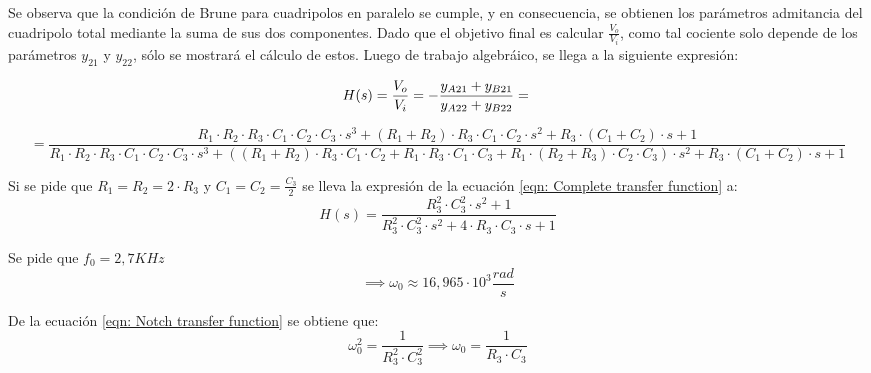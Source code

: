 Se observa que la condici\'on de Brune para cuadripolos en paralelo se cumple, y en consecuencia, se obtienen los par\'ametros admitancia del cuadripolo total mediante la suma de sus dos componentes.
Dado que el objetivo final es calcular $\frac{V_o}{V_i}$, como tal cociente solo depende de los par\'ametros $y_{21}$ y $y_{22}$, s\'olo se mostrar\'a el c\'alculo de estos.
Luego de trabajo algebr\'aico, se llega a la siguiente expresi\'on:

\begin{equation}
    H(s) = \frac{V_o}{V_i} = -\frac{y_{A21} + y_{B21}}{y_{A22} + y_{B22}} = \\
\end{equation}

\begin{equation} 
    \label{eqn: Complete transfer function}
    = \frac{R_1 \cdot R_2 \cdot R_3 \cdot C_1 \cdot C_2 \cdot C_3 \cdot s^3 + \left(R_1 + R_2\right) \cdot R_3 \cdot C_1 \cdot C_2 \cdot s^2 + R_3 \cdot \left(C_1 +C_2\right) \cdot s + 1}
    {R_1 \cdot R_2 \cdot R_3 \cdot C_1 \cdot C_2 \cdot C_3 \cdot s^3 + \left(\left(R_1 + R_2\right) \cdot R_3 \cdot C_1 \cdot C_2 + R_1 \cdot R_3 \cdot C_1 \cdot C_3 + R_1 \cdot \left(R_2 + R_3\right) \cdot C_2 \cdot C_3\right) \cdot s^2 + R_3 \cdot \left(C_1 +C_2\right) \cdot s + 1}
\end{equation}

Si se pide que $R_1 = R_2 = 2 \cdot R_3$ y $C_1 = C_2 = \frac{C_3}{2}$ se lleva la expresi\'on de la ecuaci\'on \ref{eqn: Complete transfer function} a:
\begin{equation} 
    \label{eqn: Notch transfer function}
    H(s) = \frac{R_3^2 \cdot C_3^2 \cdot s^2 + 1}{R_3^2 \cdot C_3^2 \cdot s^2 + 4 \cdot R_3 \cdot C_3 \cdot s + 1}
\end{equation}

Se pide que $f_0 = 2,7 KHz$
\begin{equation}
    \implies \omega_0 \approx  16,965 \cdot 10^3 \frac{rad}{s}
\end{equation}

De la ecuaci\'on \ref{eqn: Notch transfer function} se obtiene que:
\begin{equation}
    \omega_0^2 = \frac{1}{R_3^2 \cdot C_3^2} \implies \omega_0 = \frac{1}{R_3 \cdot C_3}
\end{equation}

